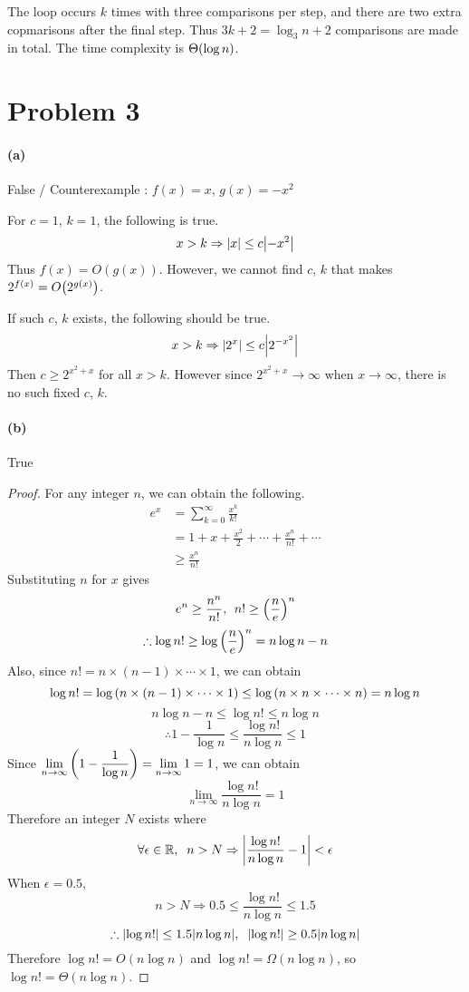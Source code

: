 \documentclass[10pt]{article}
\begin{document}
\vspace{0.3cm} The loop occurs $k$ times with three comparisons per step, and there are two extra copmarisons after the final step. 
Thus $3k+2 = \log_3n + 2$ comparisons are made in total. The time complexity is $\Theta\qty(\log n)$.

\section*{Problem 3}
\paragraph{(a)} False / Counterexample : $f(x) = x$, $g(x) = -x^2$

\vspace{0.3cm} For $c=1$, $k=1$, the following is true.
$$x>k \Rightarrow \qty|x| \leq c\qty|-x^2|$$
Thus $f(x)=O(g(x))$. However, we cannot find $c$, $k$ that makes $2^{f(x)}=O\qty(2^{g(x)})$.

\vspace{0.3cm} If such $c$, $k$ exists, the following should be true.
$$x>k \Rightarrow \qty|2^x| \leq c\qty|2^{-x^2}|$$
Then $c \geq 2^{x^2+x}$ for all $x>k$. However since $2^{x^2+x} \rightarrow \infty$ when $x \rightarrow \infty$, there is no such fixed $c$, $k$.

\paragraph{(b)} True
\begin{proof}
    For any integer $n$, we can obtain the following.
    \begin{align*}
        e^x &= \sum_{k=0}^{\infty}\frac{x^k}{k!} \\
        &= 1 + x + \frac{x^2}{2} + \cdots + \frac{x^n}{n!} + \cdots \\
        &\geq \frac{x^n}{n!}
    \end{align*}
    Substituting $n$ for $x$ gives
    $$e^n \geq \frac{n^n}{n!}, \,\; n! \geq \qty(\frac{n}{e})^n$$
    $$\therefore \log{n!} \geq \log{\qty(\frac{n}{e})^n} = n\log{n} - n$$
    Also, since $n! = n\times (n-1) \times \cdots \times 1$, we can obtain
    $$\log{n!} = \log\qty(n\times (n-1) \times \cdots \times 1) \leq \log\qty(n \times n \times \cdots \times n) = n\log{n}$$
    $$n\log{n} - n \leq \log{n!} \leq n\log{n}$$
    $$\therefore 1 - \frac{1}{\log{n}} \leq \frac{\log{n!}}{n\log{n}} \leq 1$$
    Since $\displaystyle \lim_{n \to \infty} \qty(1 - \frac{1}{\log{n}}) = \lim_{n \to \infty} 1 = 1$, we can obtain
    $$\lim_{n \to \infty} \frac{\log{n!}}{n\log{n}} = 1$$
    Therefore an integer $N$ exists where
    $$\forall\epsilon \in \mathbb{R}, \;\; n>N \Rightarrow \qty|\frac{\log{n!}}{n\log{n}} - 1| < \epsilon$$
    When $\epsilon = 0.5$,
    $$n>N \Rightarrow 0.5 \leq \frac{\log{n!}}{n\log{n}} \leq 1.5$$
    $$\therefore \qty|\log{n!}| \leq 1.5\qty|n\log{n}|,\;\; \qty|\log{n!}| \geq 0.5\qty|n\log{n}|$$
    Therefore $\log{n!} = O(n\log{n})$ and $\log{n!} = \Omega(n\log{n})$, so $\log{n!} = \Theta(n\log{n})$.

\end{proof}
\end{document}
